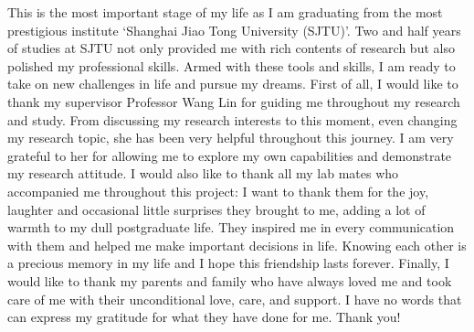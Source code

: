\begin{thanks}
	
This is the most important stage of my life as I am graduating from the most prestigious
institute ‘Shanghai Jiao Tong University (SJTU)’. Two and half years of studies at SJTU not
only provided me with rich contents of research but also polished my professional skills. Armed
with these tools and skills, I am ready to take on new challenges in life and pursue my dreams.
First of all, I would like to thank my supervisor Professor Wang Lin for guiding me
throughout my research and study. From discussing my research interests to this moment, even
changing my research topic, she has been very helpful throughout this journey. I am very grateful
to her for allowing me to explore my own capabilities and demonstrate my research attitude.
I would also like to thank all my lab mates who accompanied me throughout this project:
I want to thank them for the joy, laughter and occasional little surprises they brought to me,
adding a lot of warmth to my dull postgraduate life. They inspired me in every communication
with them and helped me make important decisions in life. Knowing each other is a precious
memory in my life and I hope this friendship lasts forever.
Finally, I would like to thank my parents and family who have always loved me and took
care of me with their unconditional love, care, and support. I have no words that can express my
gratitude for what they have done for me. Thank you!

\end{thanks}

